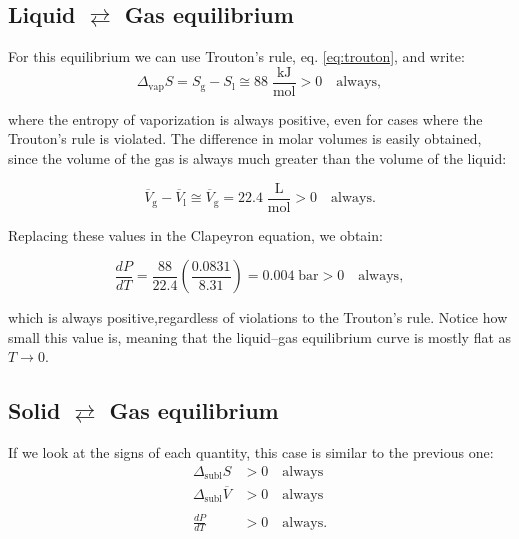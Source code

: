 \documentclass[
  9pt,
]{extbook}
\theoremstyle{definition}
\theoremstyle{definition}
\theoremstyle{definition}
\theoremstyle{remark}
\begin{document}
\hypertarget{liquid-rightleftarrows-gas-equilibrium}{%
\subsection{\texorpdfstring{Liquid \(\rightleftarrows\) Gas equilibrium}{Liquid \textbackslash rightleftarrows Gas equilibrium}}\label{liquid-rightleftarrows-gas-equilibrium}}

For this equilibrium we can use Trouton's rule, eq. \eqref{eq:trouton}, and write:
\begin{equation}
\Delta_{\text{vap}} S = S_{\text{g}}-S_{\text{l}} \cong 88 \; \frac{\text{kJ}}{\text{mol}} > 0\quad \text{always},
\label{eq:PTdia1}
\end{equation}

where the entropy of vaporization is always positive, even for cases where the Trouton's rule is violated. The difference in molar volumes is easily obtained, since the volume of the gas is always much greater than the volume of the liquid:

\begin{equation}
\overline{V}_{\text{g}} - \overline{V}_{\text{l}} \cong \overline{V}_{\text{g}} = 22.4\; \frac{\text{L}}{\text{mol}} >0\quad \text{always}.
\label{eq:PTdia2}
\end{equation}

Replacing these values in the Clapeyron equation, we obtain:

\begin{equation}
\frac{dP}{dT}=\frac{88}{22.4}\left( \frac{0.0831}{8.31} \right) = 0.004\;\text{bar} > 0 \quad \text{always},
\label{eq:PTdia3}
\end{equation}

which is always positive,regardless of violations to the Trouton's rule. Notice how small this value is, meaning that the liquid--gas equilibrium curve is mostly flat as \(T\rightarrow 0\).

\hypertarget{solid-rightleftarrows-gas-equilibrium}{%
\subsection{\texorpdfstring{Solid \(\rightleftarrows\) Gas equilibrium}{Solid \textbackslash rightleftarrows Gas equilibrium}}\label{solid-rightleftarrows-gas-equilibrium}}

If we look at the signs of each quantity, this case is similar to the previous one:
\begin{equation}
\begin{aligned}
\Delta_{\text{subl}} S &> 0 \quad \text{always} \\
\Delta_{\text{subl}} \overline{V }&> 0 \quad \text{always} \\
\\
\frac{dP}{dT} &> 0 \quad \text{always}.
\end{aligned}
\label{eq:PTdi1}
\end{equation}
\end{document}
